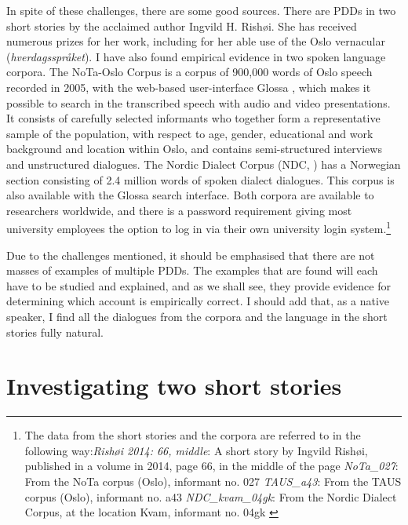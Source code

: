 \documentclass[output=paper,colorlinks,citecolor=brown]{langscibook}
\begin{document}
In spite of these challenges, there are some good sources. There are PDDs in two short stories by the acclaimed author Ingvild H. Rishøi. She has received numerous prizes for her work, including for her able use of the Oslo vernacular (\textit{hverdagsspråket}). I have also found empirical evidence in two spoken language corpora. The NoTa-Oslo Corpus \citep{JohannessenHagen2008} is a corpus of 900,000 words of Oslo speech recorded in 2005, with the web-based user-interface Glossa \citep{NøklestadEtAl2017}, which makes it possible to search in the transcribed speech with audio and video presentations. It consists of carefully selected informants who together form a representative sample of the population, with respect to age, gender, educational and work background and location within Oslo, and contains semi-structured interviews and unstructured dialogues. The Nordic Dialect Corpus (NDC, \citealt{JohannessenEtAl2009, JohannessenEtAl2014}) has a Norwegian section consisting of 2.4 million words of spoken dialect dialogues. This corpus is also available with the Glossa search interface. Both corpora are available to researchers worldwide, and there is a password requirement giving most university employees the option to log in via their own university login system.\footnote{The data from the short stories and the corpora are referred to in the following way:\newline \textit{Rishøi 2014: 66, middle}: A short story by Ingvild Rishøi, published in a volume in 2014, page 66, in the middle of the page \newline \textit{NoTa\_027}: From the NoTa corpus (Oslo), informant no. 027 \citep{JohannessenHagen2008} \newline \textit{TAUS\_a43}: From the TAUS corpus (Oslo), informant no. a43 \citep{HanssenEtAl1978} \newline \textit{NDC\_kvam\_04gk}: From the Nordic Dialect Corpus, at the location Kvam, informant no. 04gk \citep{JohannessenEtAl2009,JohannessenEtAl2014}}

Due to the challenges mentioned, it should be emphasised that there are not masses of examples of multiple PDDs. The examples that are found will each have to be studied and explained, and as we shall see, they provide evidence for determining which account is empirically correct. I should add that, as a native speaker, I find all the dialogues from the corpora and the language in the short stories fully natural.

\section{Investigating two short stories}\label{sec:johannessen:4}
\end{document}
